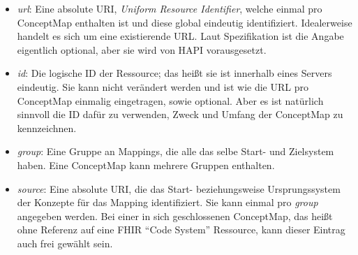 \begin{itemize}
\item \emph{url}: Eine absolute URI, \emph{Uniform Resource Identifier}, welche einmal pro ConceptMap enthalten ist und diese global eindeutig identifiziert. Idealerweise handelt es sich um eine existierende URL. Laut Spezifikation ist die Angabe eigentlich optional, aber sie wird von HAPI vorausgesetzt. %
\item \emph{id}: Die logische ID der Ressource; das heißt sie ist innerhalb eines Servers eindeutig. Sie kann nicht verändert werden und ist wie die URL pro ConceptMap einmalig eingetragen, sowie optional. Aber es ist natürlich sinnvoll die ID dafür zu verwenden, Zweck und Umfang der ConceptMap zu kennzeichnen. %
\item \emph{group}: Eine Gruppe an Mappings, die alle das selbe Start- und Zielsystem haben. Eine ConceptMap kann mehrere Gruppen enthalten. %
\item \emph{source}: Eine absolute URI, die das Start- beziehungsweise Ursprungssystem der Konzepte für das Mapping identifiziert. Sie kann einmal pro \emph{group} angegeben werden. Bei einer in sich geschlossenen ConceptMap, das heißt ohne Referenz auf eine FHIR "`Code System"' Ressource, kann dieser Eintrag auch frei gewählt sein. %

\end{itemize}
